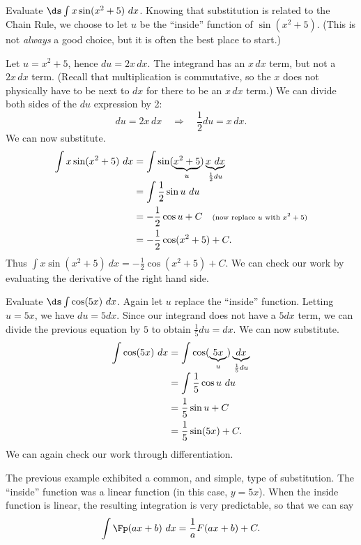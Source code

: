 \begin{example}\label{ex_sub1}
Evaluate $\ds \int x\sin(x^2+5)\ dx$.
\solution
Knowing that substitution is related to the Chain Rule, we choose to let $u$ be the ``inside'' function of $\sin(x^2+5)$. (This is not \emph{always} a good choice, but it is often the best place to start.)

Let $u = x^2+5$, hence $du = 2x\,dx$. The integrand has an $x\,dx$ term, but not a $2x\,dx$ term. (Recall that multiplication is commutative, so the $x$ does not physically have to be next to $dx$ for there to be an $x\,dx$ term.) We can divide both sides of the $du$ expression by 2:
\[du = 2x\,dx \quad \Rightarrow \quad \frac12du = x\,dx.\]
We can now substitute.
\begin{align*}
	\int x\sin(x^2+5)\ dx
	&= \int \sin(\underbrace{x^2+5}_u) \underbrace{x\ dx}_{\frac12du}\\[-.3\baselineskip]
	&= \int \frac12\sin u\ du \\
	&= -\frac12\cos u + C \quad \text{\scriptsize (now replace $u$ with $x^2+5$)}\\
	&=-\frac12\cos(x^2+5) + C.
\end{align*}
Thus $\int x\sin(x^2+5)\ dx = -\frac12\cos(x^2+5)+C$. We can check our work by evaluating the derivative of the right hand side.
\end{example}

\begin{example}\label{ex_sub2}
Evaluate $\ds \int \cos(5x)\ dx$.
\solution
Again let $u$ replace the ``inside'' function. Letting $u = 5x$, we have $du = 5dx$. Since our integrand does not have a $5dx$ term, we can divide the previous equation by $5$ to obtain $\frac15du = dx$. We can now substitute.
\begin{align*}
	\int \cos(5x)\ dx
	&= \int \cos(\underbrace{5x}_u) \underbrace{dx}_{\frac15du} \\[-.3\baselineskip]
	&=	\int \frac15\cos u \ du \\
	&= \frac15\sin u + C \\
	&= \frac15\sin (5x)+C.
\end{align*}
We can again check our work through differentiation.
\end{example}

The previous example exhibited a common, and simple, type of substitution. The ``inside'' function was a linear function (in this case, $y = 5x$). When the inside function is linear, the resulting integration is very predictable, so that we can say\vspace{-.3\baselineskip}
\[\int \Fp(ax+b)\ dx = \frac{1}{a}F(ax+b) + C.\]

